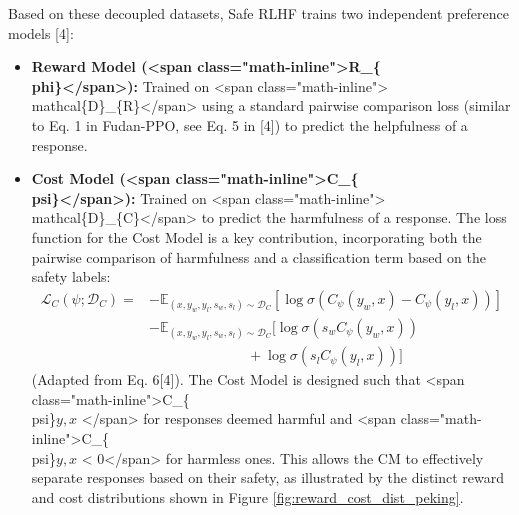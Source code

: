 \documentclass[10pt,journal,compsoc]{IEEEtran} %
\begin{document}
Based on these decoupled datasets, Safe RLHF trains two independent preference models [4]:
\begin{itemize}
    \item \textbf{Reward Model (<span class="math-inline">R\_\{\\phi\}</span>):} Trained on <span class="math-inline">\\mathcal\{D\}\_\{R\}</span> using a standard pairwise comparison loss (similar to Eq. 1 in Fudan-PPO, see Eq. 5 in [4]) to predict the helpfulness of a response.
    \item \textbf{Cost Model (<span class="math-inline">C\_\{\\psi\}</span>):} Trained on <span class="math-inline">\\mathcal\{D\}\_\{C\}</span> to predict the harmfulness of a response. The loss function for the Cost Model is a key contribution, incorporating both the pairwise comparison of harmfulness and a classification term based on the safety labels:
    \begin{align*}
    \mathcal{L}_{C}(\psi;\mathcal{D}_{C}) = &-\mathbb{E}_{(x,y_w,y_l,s_w,s_l)\sim\mathcal{D}_{C}}[\log\sigma(C_{\psi}(y_w,x)-C_{\psi}(y_l,x))] \\
                         &-\mathbb{E}_{(x,y_w,y_l,s_w,s_l)\sim\mathcal{D}_{C}}[\log\sigma(s_w C_{\psi}(y_w,x)) \\
                         & \qquad \qquad \qquad \quad + \log\sigma(s_l C_{\psi}(y_l,x))]
    \end{align*}
    (Adapted from Eq. 6[4]). The Cost Model is designed such that <span class="math-inline">C\_\{\\psi\}\(y,x\) </span> for responses deemed harmful and <span class="math-inline">C\_\{\\psi\}\(y,x\) < 0</span> for harmless ones. This allows the CM to effectively separate responses based on their safety, as illustrated by the distinct reward and cost distributions shown in Figure \ref{fig:reward_cost_dist_peking}.
\end{itemize}

\end{document}

